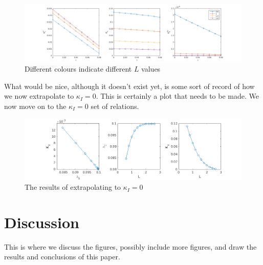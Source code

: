 \documentclass{jfm}
\begin{document}
\begin{figure}
 \centerline{
\includegraphics[scale=0.3]{./../../Graphs/KI-KII-lambda.png}}
  \caption{Different colours indicate different $L$ values}
\end{figure}

What would be nice, although it doesn't exist yet, is some sort of record of
how we now extrapolate to $\kappa_I=0$. This is certainly a plot that needs to 
be made.
We now move on to the $\kappa_I=0$ set of relations.
\begin{figure}
 \centerline{
\includegraphics[scale=0.5]{./../../Graphs/KI-0.png}}
  \caption{The results of extrapolating to $\kappa_I = 0$}
\end{figure}
\section{Discussion}
This is where we discuss the figures, possibly include more figures, and draw
the results and conclusions of this paper.
\end{document}
